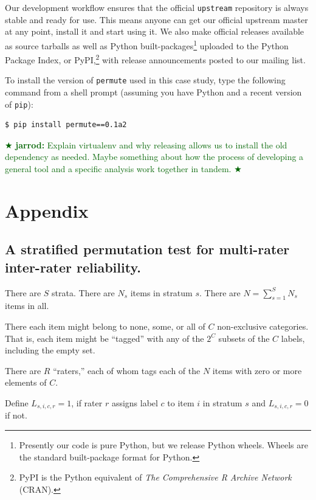 \documentclass[]{article}
\newcommand{\jarrod}[1] { \textcolor{darkgreen} {
\ensuremath{\bigstar} {\bf jarrod:}  {#1}
\ensuremath{\bigstar} } }
\begin{document}
Our development workflow ensures that the official \texttt{upstream} repository
is always stable and ready for use.
This means anyone can get our official upstream master at any point, install it
and start using it.
We also make official releases available as source tarballs as well as Python
built-packages\footnote{Presently our code is pure Python, but we release
Python wheels.
Wheels are the standard built-package format for Python.} uploaded to the
Python Package Index, or PyPI,\footnote{PyPI is the Python equivalent of \emph{The
Comprehensive R Archive Network} (CRAN).} with release announcements posted to
our mailing list.

To install the version of \texttt{permute} used in this case study, type
the following command from a shell prompt (assuming you have Python and a
recent version of \texttt{pip}):
\begin{verbatim}
$ pip install permute==0.1a2
\end{verbatim}
\jarrod{Explain virtualenv and why releasing allows us to install the
old dependency as needed.
Maybe something about how the process of developing a general tool and a
specific analysis work together in tandem.}




\pagebreak

\section*{Appendix}

\subsection*{A stratified permutation test for multi-rater inter-rater reliability.}

There are $S$ strata.
There are $N_s$ items in stratum $s$.
There are $N = \sum_{s=1}^S N_s$ items in all.

There each item might belong to none, some, or all of $C$ non-exclusive categories.
That is, each item might be ``tagged'' with any of the $2^C$ subsets
of the $C$ labels, including the empty set.

There are $R$ ``raters,'' each of whom tags each of the $N$ items with zero
or more elements of $C$.

Define $L_{s,i,c,r} = 1$, if rater $r$ assigns label $c$ to item $i$ in stratum
$s$ and $L_{s,i,c,r} = 0$ if not.
\end{document}
